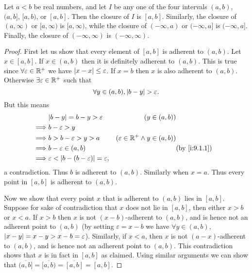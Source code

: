 \begin{lem}\label{i:9.1.12}
  Let \(a < b\) be real numbers, and let \(I\) be any one of the four intervals \((a, b)\), \((a, b]\), \([a, b)\), or \([a, b]\).
  Then the closure of \(I\) is \([a, b]\).
  Similarly, the closure of \((a, \infty)\) or \([a, \infty)\) is \([a, \infty)\), while the closure of \((-\infty, a)\) or \((-\infty, a]\) is \((-\infty, a]\).
  Finally, the closure of \((-\infty, \infty)\) is \((-\infty, \infty)\).
\end{lem}

\begin{proof}
  First let us show that every element of \([a, b]\) is adherent to \((a, b)\).
  Let \(x \in [a, b]\).
  If \(x \in (a, b)\) then it is definitely adherent to \((a, b)\).
  This is true since \(\forall \varepsilon \in \mathbb{R}^+\) we have \(\left\lvert x - x\right\rvert \leq \varepsilon\).
  If \(x = b\) then \(x\) is also adherent to \((a, b)\).
  Otherwise \(\exists \varepsilon \in \mathbb{R}^+\) such that
  \[
    \forall y \in (a, b), \left\lvert b - y\right\rvert > \varepsilon.
  \]
  But this means
  \begin{align*}
             & \abs{b - y} = b - y > \varepsilon                        & (y \in (a, b))                                           \\
    \implies & b - \varepsilon > y                                                                                                 \\
    \implies & b > b - \varepsilon > y > a                              & (\varepsilon \in \R^+ \land y \in (a, b))                \\
    \implies & b - \varepsilon \in (a, b)                               &                                           & \by{i:9.1.1} \\
    \implies & \varepsilon < \abs{b - (b - \varepsilon)} = \varepsilon,
  \end{align*}
  a contradiction.
  Thus \(b\) is adherent to \((a, b)\).
  Similarly when \(x = a\).
  Thus every point in \([a, b]\) is adherent to \((a, b)\).

  Now we show that every point \(x\) that is adherent to \((a, b)\) lies in \([a, b]\).
  Suppose for sake of contradiction that \(x\) does not lie in \([a, b]\), then either \(x > b\) or \(x < a\).
  If \(x > b\) then \(x\) is not \((x - b)\)-adherent to \((a, b)\), and is hence not an adherent point to \((a, b)\)
  (by setting \(\varepsilon = x - b\) we have \(\forall y \in (a, b)\), \(\left\lvert x - y\right\rvert = x - y > x - b = \varepsilon\)).
  Similarly, if \(x < a\), then \(x\) is not \((a - x)\)-adherent to \((a, b)\), and is hence not an adherent point to \((a, b)\).
  This contradiction shows that \(x\) is in fact in \([a, b]\) as claimed.
  Using similar arguments we can show that \(\overline{(a, b]} = \overline{[a, b)} = \overline{[a, b]} = [a, b]\).


\end{proof}
